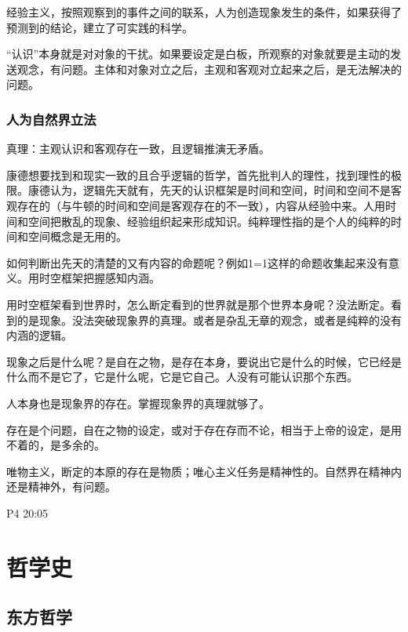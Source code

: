 \documentclass[UTF8]{../RepresentationUniverse}
\begin{document}
经验主义，按照观察到的事件之间的联系，人为创造现象发生的条件，如果获得了预测到的结论，建立了可实践的科学。

“认识”本身就是对对象的干扰。如果要设定是白板，所观察的对象就要是主动的发送观念，有问题。主体和对象对立之后，主观和客观对立起来之后，是无法解决的问题。

\subsection{人为自然界立法}



真理：主观认识和客观存在一致，且逻辑推演无矛盾。

康德想要找到和现实一致的且合乎逻辑的哲学，首先批判人的理性，找到理性的极限。康德认为，逻辑先天就有，先天的认识框架是时间和空间，时间和空间不是客观存在的（与牛顿的时间和空间是客观存在的不一致），内容从经验中来。人用时间和空间把散乱的现象、经验组织起来形成知识。纯粹理性指的是个人的纯粹的时间和空间概念是无用的。

如何判断出先天的清楚的又有内容的命题呢？例如1=1这样的命题收集起来没有意义。用时空框架把握感知内涵。

用时空框架看到世界时，怎么断定看到的世界就是那个世界本身呢？没法断定。看到的是现象。没法突破现象界的真理。或者是杂乱无章的观念，或者是纯粹的没有内涵的逻辑。

现象之后是什么呢？是自在之物，是存在本身，要说出它是什么的时候，它已经是什么而不是它了，它是什么呢，它是它自己。人没有可能认识那个东西。

人本身也是现象界的存在。掌握现象界的真理就够了。

存在是个问题，自在之物的设定，或对于存在存而不论，相当于上帝的设定，是用不着的，是多余的。


唯物主义，断定的本原的存在是物质；唯心主义任务是精神性的。自然界在精神内还是精神外，有问题。

P4 20:05















\chapter{哲学史}

    \section{东方哲学}
\end{document}
